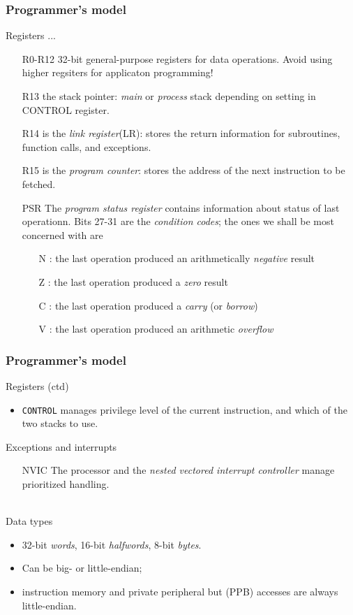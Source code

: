 \documentclass[10pt]{beamer}
\begin{document}
\begin{frame}
\frametitle{Programmer's model}
Registers ...
\begin{itemize}
\item[R0-R12]  32-bit general-purpose registers for data operations. Avoid using higher regsiters for applicaton programming!
\item[R13] the stack pointer: \emph{main} or \emph{process} stack depending on setting in CONTROL register.
\item[R14] is the \emph{link register}(LR): stores the return information for subroutines, function calls, and exceptions.
\item[R15] is the \emph{program counter}: stores the address of the next instruction to be fetched.
\item[PSR] The \emph{program status register} contains information about status of last operationn. Bits 27-31 are the \emph{condition codes}; the ones we shall be most concerned with are
  \begin{itemize}
  \item[N]: the last operation produced an arithmetically \emph{negative} result
  \item[Z]: the last operation produced a \emph{zero} result
  \item[C]: the last operation produced a \emph{carry} (or \emph{borrow})
  \item[V]: the last operation produced an arithmetic \emph{overflow}
  \end{itemize}
\end{itemize}
\end{frame}

\begin{frame}
\frametitle{Programmer's model}
Registers (ctd)
\begin{itemize}
\item \texttt{\color{blue}CONTROL} manages privilege level of the current instruction, and which of the two stacks to use.
\end{itemize}

Exceptions and interrupts
\begin{itemize}
\item[NVIC] The processor and the \emph{nested vectored interrupt controller} manage prioritized handling.
\end{itemize}
~\\
Data types
\begin{itemize}
\item 32-bit \emph{words}, 16-bit \emph{halfwords}, 8-bit \emph{bytes}.
\item Can be big- or little-endian;
\item instruction memory and private peripheral but (PPB) accesses are always little-endian. 
\end{itemize}

\end{frame}
\end{document}
